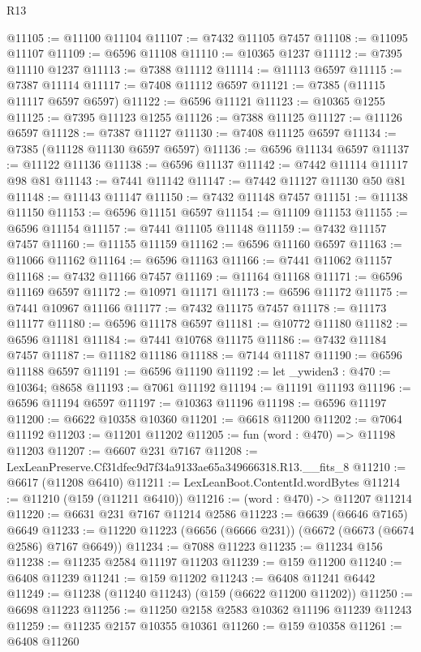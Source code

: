 \begin{lexlean}{R13}
\begin{coremodule}
@11105 := @11100 @11104
@11107 := @7432 @11105 @7457
@11108 := @11095 @11107
@11109 := @6596 @11108
@11110 := @10365 @1237
@11112 := @7395 @11110 @1237
@11113 := @7388 @11112
@11114 := @11113 @6597
@11115 := @7387 @11114
@11117 := @7408 @11112 @6597
@11121 := @7385 (@11115 @11117 @6597 @6597)
@11122 := @6596 @11121
@11123 := @10365 @1255
@11125 := @7395 @11123 @1255
@11126 := @7388 @11125
@11127 := @11126 @6597
@11128 := @7387 @11127
@11130 := @7408 @11125 @6597
@11134 := @7385 (@11128 @11130 @6597 @6597)
@11136 := @6596 @11134 @6597
@11137 := @11122 @11136
@11138 := @6596 @11137
@11142 := @7442 @11114 @11117 @98 @81
@11143 := @7441 @11142
@11147 := @7442 @11127 @11130 @50 @81
@11148 := @11143 @11147
@11150 := @7432 @11148 @7457
@11151 := @11138 @11150
@11153 := @6596 @11151 @6597
@11154 := @11109 @11153
@11155 := @6596 @11154
@11157 := @7441 @11105 @11148
@11159 := @7432 @11157 @7457
@11160 := @11155 @11159
@11162 := @6596 @11160 @6597
@11163 := @11066 @11162
@11164 := @6596 @11163
@11166 := @7441 @11062 @11157
@11168 := @7432 @11166 @7457
@11169 := @11164 @11168
@11171 := @6596 @11169 @6597
@11172 := @10971 @11171
@11173 := @6596 @11172
@11175 := @7441 @10967 @11166
@11177 := @7432 @11175 @7457
@11178 := @11173 @11177
@11180 := @6596 @11178 @6597
@11181 := @10772 @11180
@11182 := @6596 @11181
@11184 := @7441 @10768 @11175
@11186 := @7432 @11184 @7457
@11187 := @11182 @11186
@11188 := @7144 @11187
@11190 := @6596 @11188 @6597
@11191 := @6596 @11190
@11192 := let _ywiden3 : @470 := @10364; @8658
@11193 := @7061 @11192
@11194 := @11191 @11193
@11196 := @6596 @11194 @6597
@11197 := @10363 @11196
@11198 := @6596 @11197
@11200 := @6622 @10358 @10360
@11201 := @6618 @11200
@11202 := @7064 @11192
@11203 := @11201 @11202
@11205 := fun (word : @470) => @11198 @11203
@11207 := @6607 @231 @7167
@11208 := LexLeanPreserve.Cf31dfec9d7f34a9133ae65a349666318.R13.__fits_8
@11210 := @6617 (@11208 @6410)
@11211 := LexLeanBoot.ContentId.wordBytes
@11214 := @11210 (@159 (@11211 @6410))
@11216 := (word : @470) -> @11207 @11214
@11220 := @6631 @231 @7167 @11214 @2586
@11223 := @6639 (@6646 @7165) @6649
@11233 := @11220 @11223 (@6656 (@6666 @231)) (@6672 (@6673 (@6674 @2586) @7167 @6649))
@11234 := @7088 @11223
@11235 := @11234 @156
@11238 := @11235 @2584 @11197 @11203
@11239 := @159 @11200
@11240 := @6408 @11239
@11241 := @159 @11202
@11243 := @6408 @11241 @6442
@11249 := @11238 (@11240 @11243) (@159 (@6622 @11200 @11202))
@11250 := @6698 @11223
@11256 := @11250 @2158 @2583 @10362 @11196 @11239 @11243
@11259 := @11235 @2157 @10355 @10361
@11260 := @159 @10358
@11261 := @6408 @11260

\end{coremodule}
\end{lexlean}
